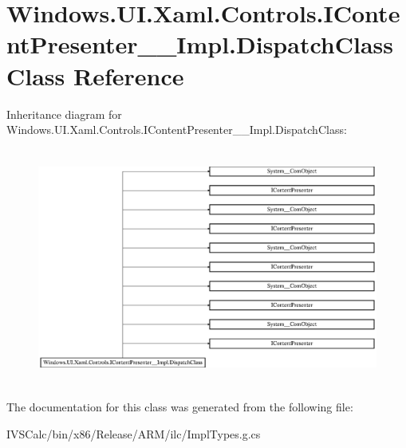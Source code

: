 \hypertarget{class_windows_1_1_u_i_1_1_xaml_1_1_controls_1_1_i_content_presenter_____impl_1_1_dispatch_class}{}\section{Windows.\+U\+I.\+Xaml.\+Controls.\+I\+Content\+Presenter\+\_\+\+\_\+\+Impl.\+Dispatch\+Class Class Reference}
\label{class_windows_1_1_u_i_1_1_xaml_1_1_controls_1_1_i_content_presenter_____impl_1_1_dispatch_class}
Inheritance diagram for Windows.\+U\+I.\+Xaml.\+Controls.\+I\+Content\+Presenter\+\_\+\+\_\+\+Impl.\+Dispatch\+Class\+:\begin{figure}[H]
\begin{center}
\leavevmode
\includegraphics[height=7.837150cm]{class_windows_1_1_u_i_1_1_xaml_1_1_controls_1_1_i_content_presenter_____impl_1_1_dispatch_class}
\end{center}
\end{figure}


The documentation for this class was generated from the following file\+:\begin{DoxyCompactItemize}
\item 
I\+V\+S\+Calc/bin/x86/\+Release/\+A\+R\+M/ilc/Impl\+Types.\+g.\+cs\end{DoxyCompactItemize}
